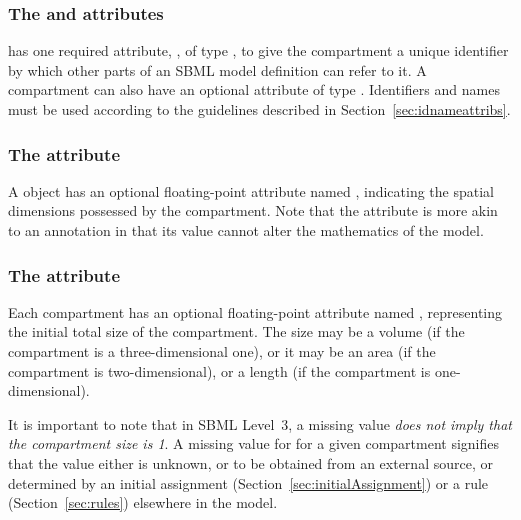 \subsubsection{The  and  attributes}

\Compartment has one required attribute, , of type
, to give the compartment a unique identifier by
which other parts of an SBML model definition can refer to it.  A
compartment can also have an optional  attribute of type
.  Identifiers and names must be used according
to the guidelines described in Section~\ref{sec:idnameattribs}.



\subsubsection{The  attribute}

A \Compartment object has an optional floating-point attribute named
, indicating the spatial dimensions possessed by the
compartment. Note that the  attribute is more akin to an 
annotation in that its value cannot alter the mathematics of the model. 

\subsubsection{The  attribute}
\label{sec:size}

Each compartment has an optional floating-point attribute named
, representing the initial total size of the
compartment.  The size may be a volume (if the compartment is a
three-dimensional one), or it may be an area (if the compartment
is two-dimensional), or a length (if the compartment is
one-dimensional).

It is important to note that in SBML Level~3, a missing
 value \emph{does not imply that the compartment size
  is 1}. A missing value for  for a given
compartment signifies that the value either is unknown, or to be
obtained from an external source, or determined by an initial
assignment (Section~\ref{sec:initialAssignment}) or a rule
(Section~\ref{sec:rules}) elsewhere in the model.  \

